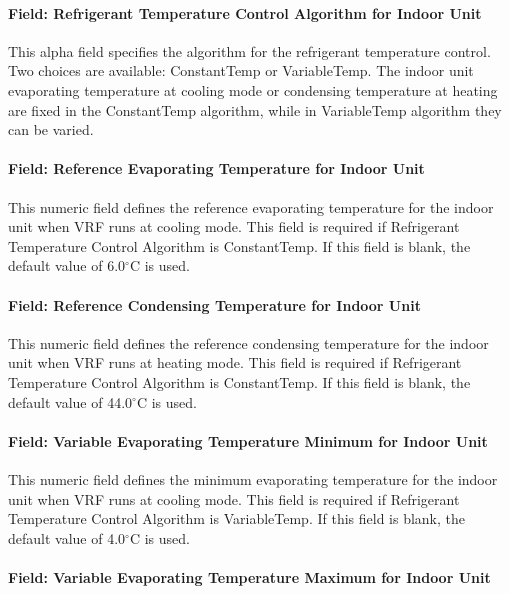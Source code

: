 \paragraph{Field: Refrigerant Temperature Control Algorithm for Indoor Unit}

This alpha field specifies the algorithm for the refrigerant temperature control. Two choices are available: ConstantTemp or VariableTemp. The indoor unit evaporating temperature at cooling mode or condensing temperature at heating are fixed in the ConstantTemp algorithm, while in VariableTemp algorithm they can be varied.

\paragraph{Field: Reference Evaporating Temperature for Indoor Unit}

This numeric field defines the reference evaporating temperature for the indoor unit when VRF runs at cooling mode. This field is required if Refrigerant Temperature Control Algorithm is ConstantTemp. If this field is blank, the default value of 6.0$^\circ$C is used.

\paragraph{Field: Reference Condensing Temperature for Indoor Unit}

This numeric field defines the reference condensing temperature for the indoor unit when VRF runs at heating mode. This field is required if Refrigerant Temperature Control Algorithm is ConstantTemp. If this field is blank, the default value of 44.0$^\circ$C is used.

\paragraph{Field: Variable Evaporating Temperature Minimum for Indoor Unit}

This numeric field defines the minimum evaporating temperature for the indoor unit when VRF runs at cooling mode. This field is required if Refrigerant Temperature Control Algorithm is VariableTemp. If this field is blank, the default value of 4.0$^\circ$C is used.

\paragraph{Field: Variable Evaporating Temperature Maximum for Indoor Unit}

